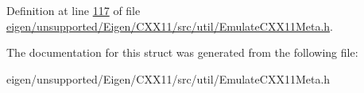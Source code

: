 Definition at line \hyperlink{eigen_2unsupported_2_eigen_2_c_x_x11_2src_2util_2_emulate_c_x_x11_meta_8h_source_l00117}{117} of file \hyperlink{eigen_2unsupported_2_eigen_2_c_x_x11_2src_2util_2_emulate_c_x_x11_meta_8h_source}{eigen/unsupported/\+Eigen/\+C\+X\+X11/src/util/\+Emulate\+C\+X\+X11\+Meta.\+h}.



The documentation for this struct was generated from the following file\+:\begin{DoxyCompactItemize}
\item 
eigen/unsupported/\+Eigen/\+C\+X\+X11/src/util/\+Emulate\+C\+X\+X11\+Meta.\+h\end{DoxyCompactItemize}
